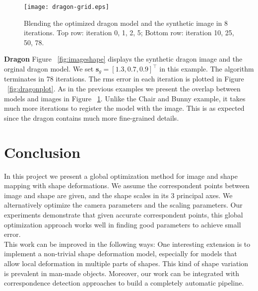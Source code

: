 \documentclass[10pt,twocolumn,letterpaper]{article}
\begin{document}
\begin{figure}[t]
\begin{center}
	\texttt{[image: dragon-grid.eps]}
\end{center}
   \caption{Blending the optimized dragon model and the synthetic image in 8 iterations. Top row: iteration 0, 1, 2, 5; Bottom row: iteration 10, 25, 50, 78.}
\label{fig:dragongrid}
\end{figure}

\noindent
\textbf{Dragon} Figure ~\ref{fig:imageshape} displays the synthetic dragon image and the orginal dragon model. We set $\mathbf{s}_g=[1.3, 0.7, 0.9]^\top$ in this example. The algorithm terminates in 78 iterations. The rms error in each iteration is plotted in Figure ~\ref{fig:dragonplot}. As in the previous examples we present the overlap between models and images in Figure ~\ref{fig:dragongrid}. Unlike the Chair and Bunny example, it takes much more iterations to register the model with the image. This is as expected since the dragon contains much more fine-grained details.

\section{Conclusion}

\noindent
In this project we present a global optimization method for image and shape mapping with shape deformations. We assume the correspondent points between image and shape are given, and the shape scales in its 3 principal axes. We alternatively optimize the camera parameters and the scaling parameters. Our experiments demonstrate that given accurate correspondent points, this global optimization approach works well in finding good parameters to achieve small error.\\

\noindent
This work can be improved in the following ways: One interesting extension is to implement a non-trivial shape deformation model, especially for models that allow local deformation in multiple parts of shapes. This kind of shape variation is prevalent in man-made objects. Moreover, our work can be integrated with correspondence detection approaches to build a completely automatic pipeline.

{\small


}
\end{document}
